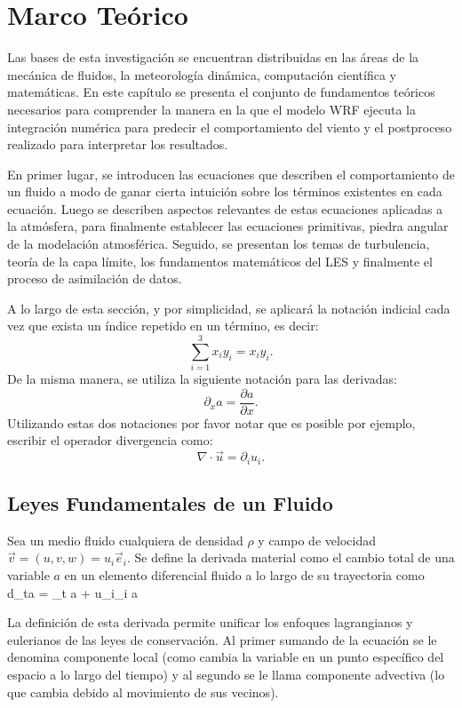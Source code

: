\chapter{Marco Teórico}
Las bases de esta investigación se encuentran distribuidas en las áreas de la mecánica de fluidos, la meteorología dinámica, computación científica y matemáticas. En este capítulo se presenta el conjunto de fundamentos teóricos necesarios para comprender la manera en la que el modelo WRF ejecuta la integración numérica para predecir el comportamiento del viento y el postproceso realizado para interpretar los resultados. 

En primer lugar, se introducen las ecuaciones que describen el comportamiento de un fluido a modo de ganar cierta intuición sobre los términos existentes en cada ecuación. Luego se describen aspectos relevantes de estas ecuaciones aplicadas a la atmósfera, para finalmente establecer las ecuaciones primitivas, piedra angular de la modelación atmosférica. Seguido, se presentan los temas de turbulencia, teoría de la capa límite, los fundamentos matemáticos del LES y finalmente el proceso de asimilación de datos.

A lo largo de esta sección, y por simplicidad, se aplicará la notación indicial cada vez que exista un índice repetido en un término, es decir:
\begin{equation}\label{eq:indicial}
\sum_{i=1}^{3}\! x_i y_i = x_i y_i.
\end{equation}
De la misma manera, se utiliza la siguiente notación para las derivadas:
\begin{equation}
\partial_x a = \frac{\partial a}{\partial x}.
\end{equation}
Utilizando estas dos notaciones por favor notar que es posible por ejemplo, escribir el operador divergencia como:
\begin{equation}\label{eq:divergencia}
\nabla\cdot\vec{u} = \partial_i u_i.
\end{equation}
\section{Leyes Fundamentales de un Fluido}
Sea un medio fluido cualquiera de densidad $\rho$ y campo de velocidad $\vec{v}=(u,v,w)=u_i\vec{e}_i$. Se define la derivada material como el cambio total de una variable $a$ en un elemento diferencial fluido a lo largo de su trayectoria como
\be 
d_ta = \partial_t a + u_i\partial_i a
\ee

La definición de esta derivada permite unificar los enfoques lagrangianos y eulerianos de las leyes de conservación. Al primer sumando de la ecuación se le denomina componente local (como cambia la variable en un punto específico del espacio a lo largo del tiempo) y al segundo se le llama componente advectiva (lo que cambia debido al movimiento de sus vecinos).
